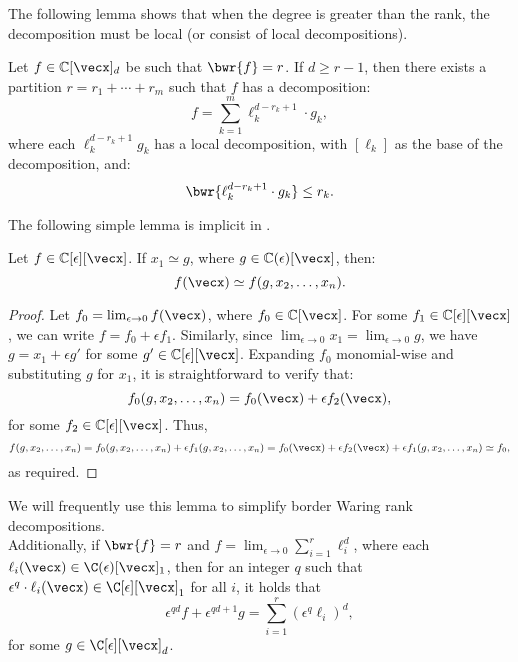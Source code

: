 \documentclass{article}
\begin{document}
The following lemma shows that when the degree is greater than the rank, the decomposition must be local (or consist of local decompositions).





\begin{lemma}\label{lem:local-partition}
    Let \( f \in \mathbb{C}[\vecx]_d \) be such that \( \bwr{f} = r \). If \( d \geq r - 1 \), then there exists a partition \( r = r_1 + \cdots + r_m \) such that \( f \) has a decomposition:
    \[
    f = \sum_{k=1}^{m} \ell_k^{d-r_k+1} \cdot g_k,
    \]
    where each \( \ell_k^{d-r_k+1} g_k \) has a local decomposition, with \( [\ell_k] \) as the base of the decomposition, and:
    \[
    \bwr{\ell_k^{d-r_k+1} \cdot g_k} \leq r_k.
    \]
\end{lemma}



The following simple lemma is implicit in \cite{DuttaGIJL24}.


\begin{lemma}\label{lem:e-change}
    Let \( f \in \mathbb{C}[\epsilon][\vecx] \). If \( x_1 \simeq g \), where \( g \in \mathbb{C}(\epsilon)[\vecx] \), then:
    \[
    f(\vecx) \simeq f(g, x_2, \ldots, x_n).
    \]
\end{lemma}
\begin{proof}
    Let \( f_0 = \lim_{\epsilon \to 0} f(\vecx) \), where \( f_0 \in \mathbb{C}[\vecx] \). For some \( f_1 \in \mathbb{C}[\epsilon][\vecx] \), we can write \( f = f_0 + \epsilon f_1 \). Similarly, since \( \lim_{\epsilon \to 0} x_1 = \lim_{\epsilon \to 0} g \), we have \( g = x_1 + \epsilon g' \) for some \( g' \in \mathbb{C}[\epsilon][\vecx] \). Expanding \( f_0 \) monomial-wise and substituting \( g \) for \( x_1 \), it is straightforward to verify that:
    \[
    f_0(g, x_2, \ldots, x_n) = f_0(\vecx) + \epsilon f_2(\vecx),
    \]
    for some \( f_2 \in \mathbb{C}[\epsilon][\vecx] \). Thus, \[
    f(g, x_2, \ldots, x_n) = f_0(g, x_2, \ldots, x_n)+\epsilon f_1(g, x_2, \ldots, x_n)=  f_0(\vecx) + \epsilon f_2(\vecx)+\epsilon f_1(g, x_2, \ldots, x_n)\simeq f_0,
    \]
    as required.
\end{proof}



We will frequently use this lemma to simplify border Waring rank decompositions.\\

Additionally, if $\bwr{f} = r$ and $f = \lim_{\epsilon \to 0}\sum_{i=1}^{r}\ell_i^d$, where each $\ell_i(\vecx) \in \C(\epsilon)[\vecx]_1$, then for an integer $q$ such that $\epsilon^q \cdot \ell_i(\vecx) \in \C[\epsilon][\vecx]_1$ for all $i$, it holds that
\begin{equation*}
\epsilon^{qd}f + \epsilon^{qd+1}g = \sum_{i=1}^{r}(\epsilon^q \ell_i)^d,    
\end{equation*}
for some $g \in \C[\epsilon][\vecx]_d$.
\end{document}
